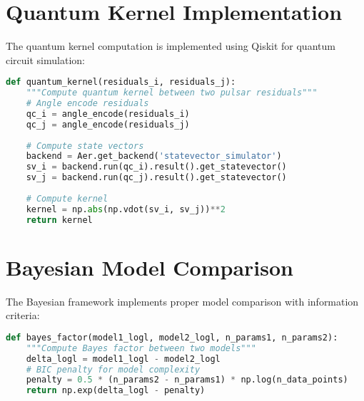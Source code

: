 \documentclass[12pt,a4paper]{article}
\begin{document}
\appendix

\section{Quantum Kernel Implementation}

The quantum kernel computation is implemented using Qiskit for quantum circuit simulation:

\begin{lstlisting}[language=Python, caption=Quantum Kernel Implementation]
def quantum_kernel(residuals_i, residuals_j):
    """Compute quantum kernel between two pulsar residuals"""
    # Angle encode residuals
    qc_i = angle_encode(residuals_i)
    qc_j = angle_encode(residuals_j)
    
    # Compute state vectors
    backend = Aer.get_backend('statevector_simulator')
    sv_i = backend.run(qc_i).result().get_statevector()
    sv_j = backend.run(qc_j).result().get_statevector()
    
    # Compute kernel
    kernel = np.abs(np.vdot(sv_i, sv_j))**2
    return kernel
\end{lstlisting}

\section{Bayesian Model Comparison}

The Bayesian framework implements proper model comparison with information criteria:

\begin{lstlisting}[language=Python, caption=Bayesian Model Comparison]
def bayes_factor(model1_logl, model2_logl, n_params1, n_params2):
    """Compute Bayes factor between two models"""
    delta_logl = model1_logl - model2_logl
    # BIC penalty for model complexity
    penalty = 0.5 * (n_params2 - n_params1) * np.log(n_data_points)
    return np.exp(delta_logl - penalty)
\end{lstlisting}
\end{document}
